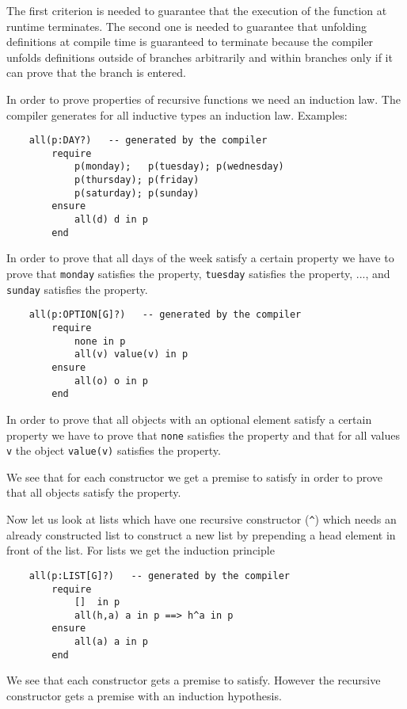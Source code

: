 The first criterion is needed to guarantee that the execution of the function
at runtime terminates. The second one is needed to guarantee that unfolding
definitions at compile time is guaranteed to terminate because the compiler
unfolds definitions outside of branches arbitrarily and within branches only
if it can prove that the branch is entered.

In order to prove properties of recursive functions we need an induction
law. The compiler generates for all inductive types an induction
law. Examples:

\begin{lstlisting}
    all(p:DAY?)   -- generated by the compiler
        require
            p(monday);   p(tuesday); p(wednesday)
            p(thursday); p(friday)
            p(saturday); p(sunday)
        ensure
            all(d) d in p
        end  
\end{lstlisting}

In order to prove that all days of the week satisfy a certain property we have
to prove that \lstinline!monday! satisfies the property, \lstinline!tuesday!
satisfies the property, ..., and \lstinline!sunday! satisfies the property.

\begin{lstlisting}
    all(p:OPTION[G]?)   -- generated by the compiler
        require
            none in p
            all(v) value(v) in p
        ensure
            all(o) o in p
        end  
\end{lstlisting}

In order to prove that all objects with an optional element satisfy a certain
property we have to prove that \lstinline!none! satisfies the property and
that for all values \lstinline!v! the object \lstinline!value(v)! satisfies
the property.

We see that for each constructor we get a premise to satisfy in order to prove
that all objects satisfy the property.



Now let us look at lists which have one recursive constructor (\lstinline!^!)
which needs an already constructed list to construct a new list by prepending
a head element in front of the list. For lists we get the induction principle

\begin{lstlisting}
    all(p:LIST[G]?)   -- generated by the compiler
        require
            []  in p
            all(h,a) a in p ==> h^a in p
        ensure
            all(a) a in p
        end  
\end{lstlisting}
We see that each constructor gets a premise to satisfy. However the recursive
constructor gets a premise with an induction hypothesis.

